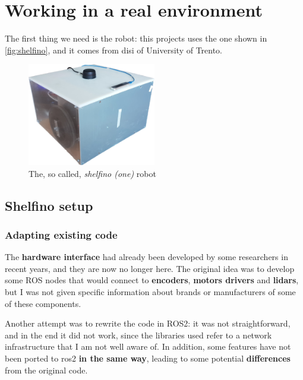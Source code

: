 
\chapter{Working in a real environment}
\label{cha:realworld}

The first thing we need is the robot: this projects uses the one shown in \autoref{fig:shelfino}, and it comes from \acrfull{disi} of University of Trento.

\bigskip

\begin{figure}[h]
  \centering
  \includegraphics[width=0.5\textwidth]{images/shelfino}
  \caption{The, so called, \textit{shelfino (one)} robot}
  \label{fig:shelfino}
\end{figure}

\section{Shelfino setup} 

\subsection{Adapting existing code}

The \textbf{hardware interface} had already been developed by some researchers in recent years, and they are now no longer here. The original idea was to develop some ROS nodes that would connect to \textbf{encoders}, \textbf{motors drivers} and \textbf{lidars}, but I was not given specific information about brands or manufacturers of some of these components.

Another attempt was to rewrite the code in ROS2: it was not straightforward, and in the end it did not work, since the libraries used refer to a network infrastructure that I am not well aware of. In addition, some features have not been ported to \acrshort{ros}2 \textbf{in the same way}, leading to some potential \textbf{differences} from the original code.

